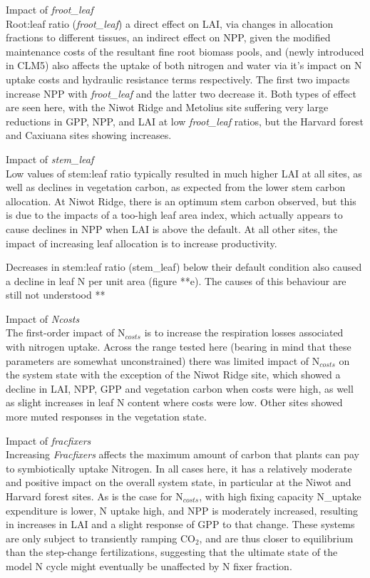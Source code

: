 \documentclass[draft,linenumbers]{agujournal}
\begin{document}
Impact of \emph{froot\_leaf}\\
Root:leaf ratio (\emph{froot\_leaf}) a direct effect on LAI, via changes in allocation fractions to different tissues, an indirect effect on NPP, given the modified maintenance costs of the resultant fine root biomass pools, and (newly introduced in CLM5) also affects the uptake of both nitrogen and water via it's impact on N uptake costs and hydraulic resistance terms respectively. The first two impacts increase NPP with \emph{froot\_leaf} and the latter two decrease it.  Both types of effect are seen here, with the Niwot Ridge and Metolius site suffering very large reductions in GPP, NPP, and LAI at low \emph{froot\_leaf} ratios, but the Harvard forest and Caxiuana sites showing increases. 


Impact of \emph{stem\_leaf}\\
Low values of stem:leaf ratio typically resulted in much higher LAI at all sites, as well as declines in vegetation carbon, as expected from the lower stem carbon allocation. At Niwot Ridge, there is an optimum stem carbon observed, but this is due to the impacts of a too-high leaf area index, which actually appears to cause declines in NPP when LAI is above the default. At all other sites, the impact of increasing leaf allocation is to increase productivity. 

Decreases in stem:leaf ratio (stem\_leaf) below their default condition also caused a decline in leaf N per unit area (figure **e).  The causes of this behaviour are still not understood **

Impact of \emph{Ncosts}\\
The first-order impact of N$_{costs}$ is to increase the respiration losses associated with nitrogen uptake.  Across the range tested here (bearing in mind that these parameters are somewhat unconstrained) there was limited impact of N$_{costs}$ on the system state with the exception of the Niwot Ridge site, which showed a decline in LAI, NPP, GPP and vegetation carbon when costs were high, as well as slight increases in leaf N content where costs were low. Other sites showed more muted responses in the vegetation state. 

Impact of \emph{fracfixers}\\
Increasing \emph{Fracfixers} affects the maximum amount of carbon that plants can pay to symbiotically uptake Nitrogen. In all cases here, it has a relatively moderate and positive impact on the overall system state, in particular at the Niwot and Harvard forest sites. As is the case for N$_{costs}$, with high fixing capacity N\_uptake expenditure is lower, N uptake high, and NPP is moderately increased, resulting in increases in LAI and a slight response of GPP to that change.  These systems are only subject to transiently ramping CO$_{2}$, and are thus closer to equilibrium than the step-change fertilizations, suggesting that the ultimate state of the model N cycle might eventually be unaffected by N fixer fraction. 
\end{document}
